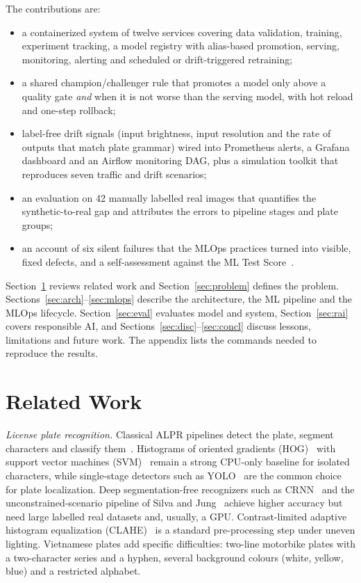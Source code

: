 \documentclass[conference]{IEEEtran}
\begin{document}
The contributions are:
\begin{itemize}
\item a containerized system of twelve services covering data validation,
training, experiment tracking, a model registry with alias-based promotion,
serving, monitoring, alerting and scheduled or drift-triggered retraining;
\item a shared champion/challenger rule that promotes a model only above a quality
gate \emph{and} when it is not worse than the serving model, with hot reload and
one-step rollback;
\item label-free drift signals (input brightness, input resolution and the rate of
outputs that match plate grammar) wired into Prometheus alerts, a Grafana
dashboard and an Airflow monitoring DAG, plus a simulation toolkit that
reproduces seven traffic and drift scenarios;
\item an evaluation on 42 manually labelled real images that quantifies the
synthetic-to-real gap and attributes the errors to pipeline stages and plate
groups;
\item an account of six silent failures that the MLOps practices turned into
visible, fixed defects, and a self-assessment against the ML Test
Score~\cite{breck2017mltest}.
\end{itemize}

Section~\ref{sec:related} reviews related work and Section~\ref{sec:problem}
defines the problem. Sections~\ref{sec:arch}--\ref{sec:mlops} describe the
architecture, the ML pipeline and the MLOps lifecycle. Section~\ref{sec:eval}
evaluates model and system, Section~\ref{sec:rai} covers responsible AI, and
Sections~\ref{sec:disc}--\ref{sec:concl} discuss lessons, limitations and future
work. The appendix lists the commands needed to reproduce the results.

\section{Related Work}\label{sec:related}
\textit{License plate recognition.} Classical ALPR pipelines detect the plate,
segment characters and classify them~\cite{du2013alpr}. Histograms of oriented
gradients (HOG)~\cite{dalal2005hog} with support vector machines
(SVM)~\cite{cortes1995svm} remain a strong CPU-only baseline for isolated
characters, while single-stage detectors such as YOLO~\cite{redmon2016yolo,
jocher2023yolov8} are the common choice for plate localization. Deep
segmentation-free recognizers such as CRNN~\cite{shi2017crnn} and the
unconstrained-scenario pipeline of Silva and Jung~\cite{silva2018alpr} achieve
higher accuracy but need large labelled real datasets and, usually, a GPU.
Contrast-limited adaptive histogram equalization
(CLAHE)~\cite{zuiderveld1994clahe} is a standard pre-processing step under uneven
lighting. Vietnamese plates add specific difficulties: two-line motorbike plates
with a two-character series and a hyphen, several background colours (white,
yellow, blue) and a restricted alphabet.
\end{document}
